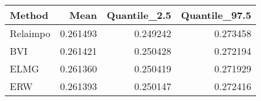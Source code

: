 \begin{table}[ht]
\centering
\begin{tabular}{lrrr}
  \hline
Method & Mean & Quantile\_2.5 & Quantile\_97.5 \\ 
  \hline
Relaimpo & 0.261493 & 0.249242 & 0.273458 \\ 
  BVI & 0.261421 & 0.250428 & 0.272194 \\ 
  ELMG & 0.261360 & 0.250419 & 0.271929 \\ 
  ERW & 0.261393 & 0.250147 & 0.272416 \\ 
   \hline
\end{tabular}
\end{table}
